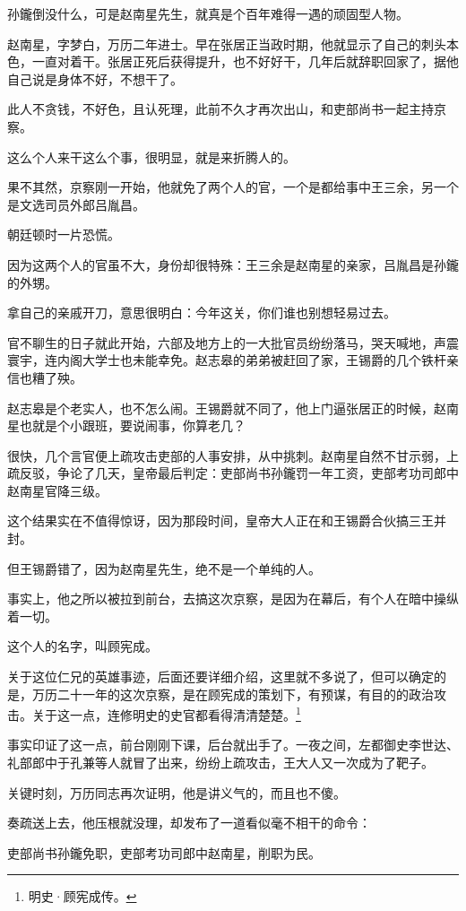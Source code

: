 \begin{multicols}{\theparacolNo}
		孙鑨倒没什么，可是赵南星先生，就真是个百年难得一遇的顽固型人物。

		赵南星，字梦白，万历二年进士。早在张居正当政时期，他就显示了自己的刺头本色，一直对着干。张居正死后获得提升，也不好好干，几年后就辞职回家了，据他自己说是身体不好，不想干了。

		此人不贪钱，不好色，且认死理，此前不久才再次出山，和吏部尚书一起主持京察。

		这么个人来干这么个事，很明显，就是来折腾人的。

		果不其然，京察刚一开始，他就免了两个人的官，一个是都给事中王三余，另一个是文选司员外郎吕胤昌。

		朝廷顿时一片恐慌。

		因为这两个人的官虽不大，身份却很特殊：王三余是赵南星的亲家，吕胤昌是孙鑨的外甥。

		拿自己的亲戚开刀，意思很明白：今年这关，你们谁也别想轻易过去。

		官不聊生的日子就此开始，六部及地方上的一大批官员纷纷落马，哭天喊地，声震寰宇，连内阁大学士也未能幸免。赵志皋的弟弟被赶回了家，王锡爵的几个铁杆亲信也糟了殃。

		赵志皋是个老实人，也不怎么闹。王锡爵就不同了，他上门逼张居正的时候，赵南星也就是个小跟班，要说闹事，你算老几？

		很快，几个言官便上疏攻击吏部的人事安排，从中挑刺。赵南星自然不甘示弱，上疏反驳，争论了几天，皇帝最后判定：吏部尚书孙鑨罚一年工资，吏部考功司郎中赵南星官降三级。

		这个结果实在不值得惊讶，因为那段时间，皇帝大人正在和王锡爵合伙搞三王并封。

		但王锡爵错了，因为赵南星先生，绝不是一个单纯的人。

		事实上，他之所以被拉到前台，去搞这次京察，是因为在幕后，有个人在暗中操纵着一切。

		这个人的名字，叫顾宪成。

		关于这位仁兄的英雄事迹，后面还要详细介绍，这里就不多说了，但可以确定的是，万历二十一年的这次京察，是在顾宪成的策划下，有预谋，有目的的政治攻击。关于这一点，连修明史的史官都看得清清楚楚。\footnote{明史·顾宪成传。}

		事实印证了这一点，前台刚刚下课，后台就出手了。一夜之间，左都御史李世达、礼部郎中于孔兼等人就冒了出来，纷纷上疏攻击，王大人又一次成为了靶子。

		关键时刻，万历同志再次证明，他是讲义气的，而且也不傻。

		奏疏送上去，他压根就没理，却发布了一道看似毫不相干的命令：

		吏部尚书孙鑨免职，吏部考功司郎中赵南星，削职为民。


\end{multicols}

